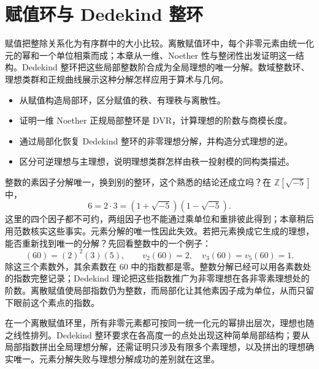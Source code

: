 
\chapter{赋值环与 Dedekind 整环}
\label{b3:ch:10}

\begin{chapterabstract}
	赋值把整除关系化为有序群中的大小比较。离散赋值环中，每个非零元素由统一化元的幂和一个单位相乘而成；本章从一维、Noether 性与整闭性出发证明这一结构。Dedekind 整环把这些局部整数阶合成为全局理想的唯一分解。数域整数环、理想类群和正规曲线展示这种分解怎样应用于算术与几何。
\end{chapterabstract}

\begin{learninggoals}
	\begin{itemize}
		\item 从赋值构造局部环，区分赋值的秩、有理秩与离散性。
		\item 证明一维 Noether 正规局部整环是 DVR，计算理想的阶数与商模长度。
		\item 通过局部化恢复 Dedekind 整环的非零理想分解，并构造分式理想的逆。
		\item 区分可逆理想与主理想，说明理想类群怎样由秩一投射模的同构类描述。
	\end{itemize}
\end{learninggoals}

整数的素因子分解唯一，换到别的整环，这个熟悉的结论还成立吗？在 \(\mathbb Z[\sqrt{-5}]\) 中，
\[
	6=2\cdot3=(1+\sqrt{-5})(1-\sqrt{-5}).
\]
这里的四个因子都不可约，两组因子也不能通过乘单位和重排彼此得到；本章稍后用范数核实这些事实。元素分解的唯一性因此失效。若把元素换成它生成的理想，能否重新找到唯一的分解？先回看整数中的一个例子：
\[
	(60)=(2)^2(3)(5),\qquad v_2(60)=2,\quad v_3(60)=v_5(60)=1.
\]
除这三个素数外，其余素数在 \(60\) 中的指数都是零。整数分解已经可以用各素数处的指数完整记录；Dedekind 理论把这些指数推广为非零理想在各非零素理想处的阶数。离散赋值使局部指数仍为整数，而局部化让其他素因子成为单位，从而只留下眼前这个素点的指数。

\ProseParagraphBreak

在一个离散赋值环里，所有非零元素都可按同一统一化元的幂排出层次，理想也随之线性排列。Dedekind 整环要求在各高度一的点处出现这种简单局部结构；要从局部指数拼出全局理想分解，还需证明只涉及有限多个素理想，以及拼出的理想确实唯一。元素分解失败与理想分解成功的差别就在这里。

